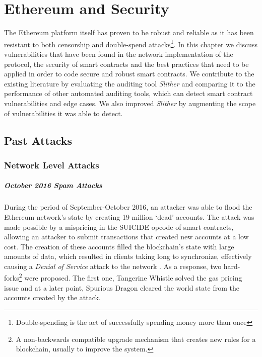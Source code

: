 \chapter{Ethereum and Security} \label{ch:security}

The Ethereum platform itself has proven to be robust and reliable as it has been resistant to both censorship and double-spend attacks\footnote{Double-spending is the act of successfully spending money more than once}. In this chapter we discuss vulnerabilities that have been found in the network implementation of the protocol, the security of smart contracts and the best practices that need to be applied in order to code secure and robust smart contracts. We contribute to the existing literature by evaluating the auditing tool \textit{Slither} and comparing it to the performance of other automated auditing tools, which can detect smart contract vulnerabilities and edge cases. We also improved \textit{Slither} by augmenting the scope of vulnerabilities it was able to detect.

\section{Past Attacks} \label{past-attacks}

\subsection{Network Level Attacks}

\paragraph{October 2016 Spam Attacks}
During the period of September-October 2016, an attacker was able to flood the Ethereum network's state by creating 19 million `dead' accounts. The attack was made possible by a mispricing in the SUICIDE opcode of smart contracts, allowing an attacker to submit transactions that created new accounts at a low cost. The creation of these accounts filled the blockchain's state with large amounts of data, which resulted in clients taking long to synchronize, effectively causing a \textit{Denial of Service} attack to the network \cite{eip150faq}. As a response, two hard-forks\footnote{A non-backwards compatible upgrade mechanism that creates new rules for a blockchain, usually to improve the system.} were proposed. The first one, Tangerine Whistle\cite{eip608} solved the gas pricing issue and at a later point, Spurious Dragon\cite{eip608} cleared the world state from the accounts created by the attack. 

